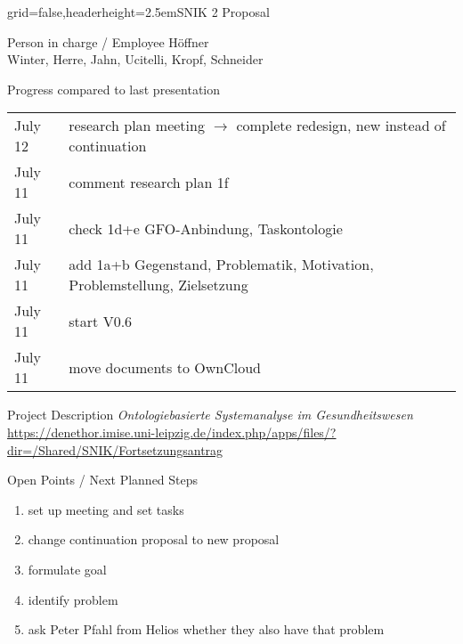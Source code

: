 \documentclass[]{kiesgrube}
\begin{document}
\begin{poster}%
{grid=false,headerheight=2.5em}{}{SNIK 2 Proposal}{}

\begin{posterbox}[name=person,column=0,row=0]{Person in charge / Employee}
Höffner\\
Winter, Herre, Jahn, Ucitelli, Kropf, Schneider
\end{posterbox}
\begin{posterbox}[name=progress,below=person]{Progress compared to last presentation}
\begin{tabulary}{\textwidth}{lL}
July 12		&research plan meeting $\rightarrow$ complete redesign, new instead of continuation\\
July 11		&comment research plan 1f\\
July 11		&check 1d+e GFO-Anbindung, Taskontologie\\
July 11		&add 1a+b Gegenstand, Problematik, Motivation, Problemstellung, Zielsetzung\\
July 11		&start V0.6\\
July 11		&move documents to OwnCloud\\
\end{tabulary}
\end{posterbox}
\begin{posterbox}[name=description,column=1,row=0]{Project Description}
\emph{Ontologiebasierte Systemanalyse im Gesundheitswesen}
\url{https://denethor.imise.uni-leipzig.de/index.php/apps/files/?dir=/Shared/SNIK/Fortsetzungsantrag}
\end{posterbox}
\begin{posterbox}[name=open,column=1,below=description]{Open Points / Next Planned Steps}
\begin{enumerate}
\item set up meeting and set tasks
\item change continuation proposal to new proposal
\item formulate goal
\item identify problem
\item ask Peter Pfahl from Helios whether they also have that problem

\end{enumerate}
\end{posterbox}
\end{poster}
\end{document}
